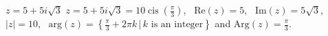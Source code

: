 { $z = 5 + 5i\sqrt{3}$}
{ $z = 5+5i\sqrt{3} = 10\operatorname{cis}\left(\frac{\pi}{3}\right)$, \, $\text{Re}(z) = 5$, \, $\text{Im}(z) = 5\sqrt{3}$, \, $|z| = 10$, \,  $\text{arg}(z) = \left\{\frac{\pi}{3} + 2\pi k \, | \, \text{$k$ is an integer} \right\}$ and $\text{Arg}(z) = \frac{\pi}{3}$.}
